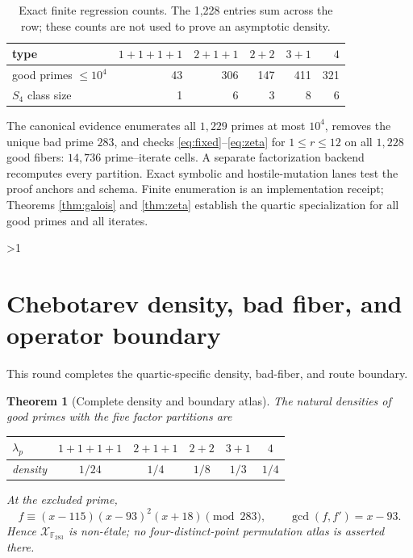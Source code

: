 \documentclass[10pt]{article}
\providecommand{\CRevisionRound}{2}
\newtheorem{theorem}{Theorem}
\begin{document}
\begin{table}[H]
\centering
\small
\begin{tabular}{@{}lrrrrr@{}}
\toprule
type & $1+1+1+1$ & $2+1+1$ & $2+2$ & $3+1$ & $4$\\
\midrule
good primes $\le10^4$ & 43 & 306 & 147 & 411 & 321\\
$S_4$ class size & 1 & 6 & 3 & 8 & 6\\
\bottomrule
\end{tabular}
\caption{Exact finite regression counts.  The 1,228 entries sum across the
row; these counts are not used to prove an asymptotic density.}
\label{tab:counts}
\end{table}

The canonical evidence enumerates all $1{,}229$ primes at most $10^4$,
removes the unique bad prime $283$, and checks \eqref{eq:fixed}--\eqref{eq:zeta}
for $1\le r\le12$ on all $1{,}228$ good fibers: $14{,}736$ prime--iterate
cells.  A separate factorization backend recomputes every partition.  Exact
symbolic and hostile-mutation lanes test the proof anchors and schema.
Finite enumeration is an implementation receipt; Theorems
\ref{thm:galois} and \ref{thm:zeta} establish the quartic specialization
for all good primes and all iterates.
\fi

\ifnum\CRevisionRound>1
\section{Chebotarev density, bad fiber, and operator boundary}
This round completes the quartic-specific density, bad-fiber, and route
boundary.

\begin{theorem}[Complete density and boundary atlas]\label{thm:density}
The natural densities of good primes with the five factor partitions are
\begin{center}
\begin{tabular}{@{}lccccc@{}}
\toprule
$\lambda_p$ & $1+1+1+1$ & $2+1+1$ & $2+2$ & $3+1$ & $4$\\
\midrule
density & $1/24$ & $1/4$ & $1/8$ & $1/3$ & $1/4$\\
\bottomrule
\end{tabular}
\end{center}
At the excluded prime,
\begin{equation}\label{eq:bad}
 f\equiv(x-115)(x-93)^2(x+18)\pmod {283},
 \qquad \gcd(f,f')=x-93.
\end{equation}
Hence $\mathcal X_{\mathbb F_{283}}$ is non-\'etale; no four-distinct-point
permutation atlas is asserted there.
\end{theorem}
\end{document}
